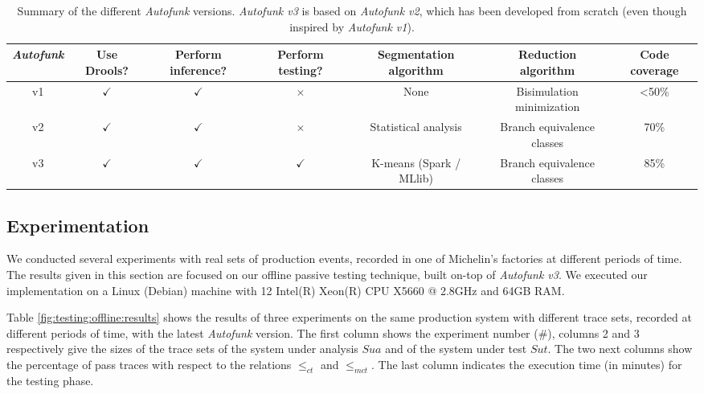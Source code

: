 \begin{sidewaystable}
\begin{center}
    \begin{tabular}{| c | c | c | c | c | c | c |}
        \hline
        \emph{Autofunk} & Use Drools? & Perform inference? & Perform testing? & Segmentation algorithm & Reduction algorithm & Code coverage\\
        \hline
        \hline
        v1 & $\checkmark$ & $\checkmark$ & $\times$ & None & Bisimulation minimization & <50\%\\
        \hline
        v2 & $\checkmark$ & $\checkmark$ & $\times$ & Statistical analysis & Branch equivalence classes & 70\%\\
        \hline
        v3 & $\checkmark$ & $\checkmark$ & $\checkmark$ & K-means (Spark / MLlib) & Branch equivalence classes & 85\%\\
        \hline
    \end{tabular}
\end{center}

    \caption{Summary of the different \emph{Autofunk} versions.
    \emph{Autofunk v3} is based on \emph{Autofunk v2}, which
    has been developed from scratch (even though inspired by
    \emph{Autofunk v1}).}

    \label{fig:autofunk-versions}
\end{sidewaystable}

\subsection{Experimentation}

We conducted several experiments with real sets of production
events, recorded in one of Michelin's factories at different
periods of time. The results given in this section are focused on
our offline passive testing technique, built on-top of
\emph{Autofunk v3}. We executed our implementation on a Linux
(Debian) machine with 12 Intel(R) Xeon(R) CPU X5660 @ 2.8GHz and
64GB RAM.

Table \ref{fig:testing:offline:results} shows the results of
three experiments on the same production system with different
trace sets, recorded at different periods of time, with the
latest \emph{Autofunk} version. The first column shows the
experiment number (\#), columns 2 and 3 respectively give the
sizes of the trace sets of the system under analysis
$\mathit{Sua}$ and of the system under test $\mathit{Sut}$. The
two next columns show the percentage of pass traces with respect
to the relations $\leq_{ct}$ and $\leq_{mct}$. The last column
indicates the execution time (in minutes) for the testing phase.

